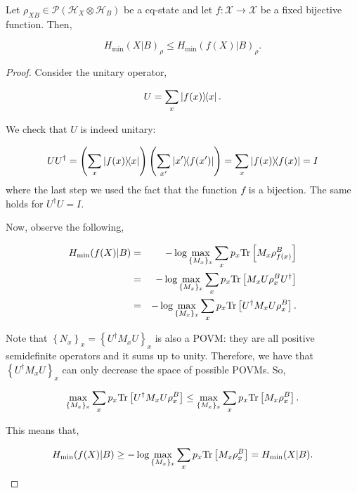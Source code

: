\begin{lemma}
Let $\rho_{XB} \in \mathcal{P}(\mathcal{H}_{X}\otimes \mathcal{H}_B)$ be a cq-state and let $f:\mathcal{X} \rightarrow \mathcal{X} $ be a fixed bijective function. Then,

$$H_{\min}(X|B)_{\rho} \leq H_{\min}(f(X)|B)_{\rho}.$$
\label{lemma:bijectivefunction}
\end{lemma}
\begin{proof}
Consider the unitary operator,

$$U = \sum_x \ketbra{f(x)}{x}.$$ 

We check that $U$ is indeed unitary:

\begin{equation*}
U U^{\dagger} = \left(\sum_x \ketbra{f(x)}{x}\right)\left(\sum_{x'} \ketbra{x'}{f(x')}\right) 
= \sum_x \ketbra{f(x)} = I
\end{equation*}
where the last step we used the fact that the function $f$ is a bijection. The same holds for $U^{\dagger}U = I$.

Now, observe the following,

\begin{eqnarray*}
H_{\min}(f(X)|B) &=& -\log \max_{\{M_x\}_x} \sum_x p_x \text{Tr}\left[M_x \rho_{f(x)}^B\right]\\
&=& -\log \max_{\{M_x\}_x} \sum_x p_x \text{Tr}\left[M_x U \rho_{x}^B U^{\dagger}\right]\\
&=& -\log \max_{\{M_x\}_x} \sum_x p_x \text{Tr}\left[U^{\dagger} M_x U \rho_{x}^B \right]. 
\end{eqnarray*}

Note that $\left\{ N_x \right\}_x= \left\{U^{\dagger} M_x U\right\}_x$ is also a POVM: they are all positive semidefinite operators and it sums up to unity. Therefore, we have that $\left\{U^{\dagger} M_x U\right\}_x$ can only decrease the space of possible POVMs. So, 

$$\max_{\{M_x\}_x} \sum_x p_x \text{Tr}\left[U^{\dagger} M_x U \rho_{x}^B \right] \leq \max_{\{M_x\}_x} \sum_x p_x \text{Tr}\left[ M_x \rho_{x}^B \right].$$

This means that, 

\begin{equation*}
H_{\min}(f(X)|B) \geq -\log \max_{\{M_x\}_x} \sum_x p_x \text{Tr}\left[ M_x \rho_{x}^B \right] = H_{\min}(X|B).
\end{equation*}
\end{proof}



